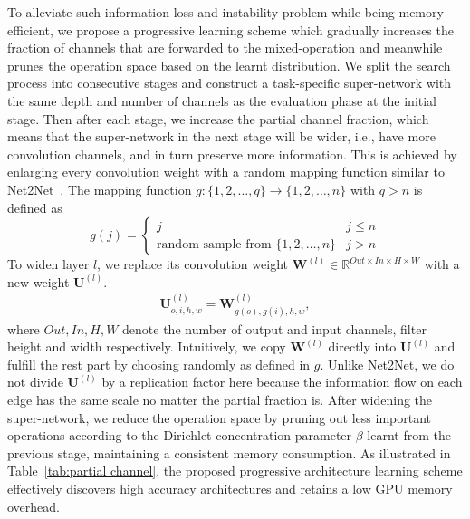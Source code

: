 \documentclass{article} \usepackage{iclr2021_conference,times}
\begin{document}
To alleviate such information loss and instability problem while being memory-efficient, we propose a progressive learning scheme which gradually increases the fraction of channels that are forwarded to the mixed-operation and meanwhile prunes the operation space based on the learnt distribution.
We split the search process into consecutive stages and construct a task-specific super-network with the same depth and number of channels as the evaluation phase at the initial stage.
Then after each stage, we increase the partial channel fraction, which means that the super-network in the next stage will be wider, i.e., have more convolution channels, and in turn preserve more information.
This is achieved by enlarging every convolution weight with a random mapping function similar to Net2Net~\citep{net2net}. The mapping function $g: \{1,2,\dots,q\}\rightarrow\{1,2,\dots,n\}$ with $q>n$ is defined as 
\begin{equation}
g(j)=
\left\{
\begin{array}{lr}
j & j\leq n \\
\text{random sample from } \{1,2,\dots,n\} & j>n
\end{array}
\right.
\end{equation}
To widen layer $l$, we replace its convolution weight $\textbf{W}^{(l)}\in \mathbb{R}^{Out\times In\times H\times W}$ with a new weight $\textbf{U}^{(l)}$.
\begin{align}
\textbf{U}^{(l)}_{o,i,h,w} = \textbf{W}^{(l)}_{g(o),g(i),h,w}, 
\end{align}
where $Out, In, H, W$ denote the number of output and input channels, filter height and width respectively.
Intuitively, we copy $\textbf{W}^{(l)}$ directly into $\textbf{U}^{(l)}$ and fulfill the rest part by choosing randomly as defined in $g$. 
Unlike Net2Net, we do not divide $\textbf{U}^{(l)}$ by a replication factor here because the information flow on each edge has the same scale no matter the partial fraction is.
After widening the super-network, we reduce the operation space by pruning out less important operations according to the Dirichlet concentration parameter $\beta$ learnt from the previous stage, maintaining a consistent memory consumption.
As illustrated in Table~\ref{tab:partial channel}, the proposed progressive architecture learning scheme effectively discovers high accuracy architectures and retains a low GPU memory overhead.
\end{document}
